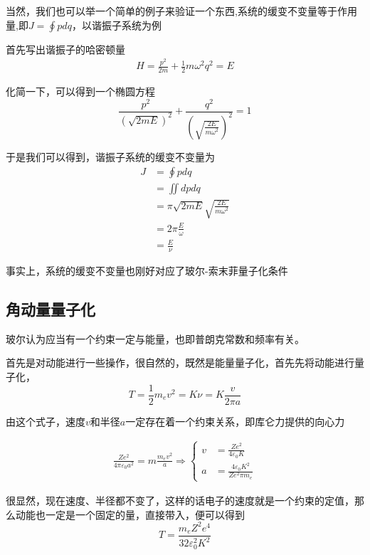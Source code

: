 \documentclass{article}
\begin{document}
当然，我们也可以举一个简单的例子来验证一个东西,系统的缓变不变量等于作用量,即$\displaystyle J=\oint pdq$，以谐振子系统为例

首先写出谐振子的哈密顿量
\begin{align*}
    H = \frac{p^2}{2m}+\frac{1}{2}m\omega^2q^2=E
\end{align*}

化简一下，可以得到一个椭圆方程
\[\frac{p^2}{(\sqrt{2mE})^2}+\frac{q^2}{(\sqrt{\frac{2E}{m\omega^2}})^2}=1\]

于是我们可以得到，谐振子系统的缓变不变量为
\begin{align*}
    J & =\oint pdq                                  \\
      & =\iint dpdq                                 \\
      & =\pi \sqrt{2mE} \sqrt{\frac{2E}{m\omega^2}} \\
      & =2\pi\frac{E}{\omega}                       \\
      & =\frac{E}{\nu}
\end{align*}

事实上，系统的缓变不变量也刚好对应了玻尔-索末菲量子化条件


\subsection{角动量量子化}
玻尔认为应当有一个约束一定与能量，也即普朗克常数和频率有关。

首先是对动能进行一些操作，很自然的，既然是能量量子化，首先先将动能进行量子化，
\[T = \frac{1}{2}m_ev^2=K\nu=K\frac{v}{2\pi a}\]

由这个式子，速度$v$和半径$a$一定存在着一个约束关系，即库仑力提供的向心力

\begin{align*}
    \frac{Ze^2}{4\pi\varepsilon_0a^2}=m\frac{m_ev^2}{a}
    \Rightarrow
    \begin{cases}
        v & = \frac{Ze^2}{4\varepsilon_0K}          \\
        a & = \frac{4\varepsilon_0K^2}{Ze^2\pi m_e}
    \end{cases}
\end{align*}

很显然，现在速度、半径都不变了，这样的话电子的速度就是一个约束的定值，那么动能也一定是一个固定的量，直接带入，便可以得到
\begin{equation*}
    T = \frac{m_eZ^2e^4}{32\varepsilon_0^2K^2}
\end{equation*}
\end{document}

